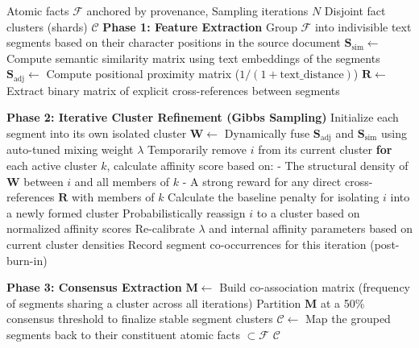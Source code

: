 \begin{algorithm}[t]
\caption{Segment-Grounded Fact Clustering}
\label{alg:cluster}
\begin{algorithmic}[1]
  \Require Atomic facts $\mathcal{F}$ anchored by provenance, Sampling iterations $N$
  \Ensure Disjoint fact clusters (shards) $\mathcal{C}$
  \State \textbf{Phase 1: Feature Extraction}
  \State Group $\mathcal{F}$ into indivisible text segments based on their character positions in the source document
  \State $\mathbf{S}_{\text{sim}} \gets$ Compute semantic similarity matrix using text embeddings of the segments
  \State $\mathbf{S}_{\text{adj}} \gets$ Compute positional proximity matrix ($1 / (1 + \text{text\_distance})$)
  \State $\mathbf{R} \gets$ Extract binary matrix of explicit cross-references between segments
  
  \State \textbf{Phase 2: Iterative Cluster Refinement (Gibbs Sampling)}
  \State Initialize each segment into its own isolated cluster
    \State $\mathbf{W} \gets$ Dynamically fuse $\mathbf{S}_{\text{adj}}$ and $\mathbf{S}_{\text{sim}}$ using auto-tuned mixing weight $\lambda$
      \State Temporarily remove $i$ from its current cluster
      \State \textbf{for} each active cluster $k$, calculate affinity score based on:
      \State \quad - The structural density of $\mathbf{W}$ between $i$ and all members of $k$
      \State \quad - A strong reward for any direct cross-references $\mathbf{R}$ with members of $k$
      \State Calculate the baseline penalty for isolating $i$ into a newly formed cluster
      \State Probabilistically reassign $i$ to a cluster based on normalized affinity scores
    \EndFor
      \State Re-calibrate $\lambda$ and internal affinity parameters based on current cluster densities
    \EndIf
    \State Record segment co-occurrences for this iteration (post-burn-in)
  \EndFor
  
  \State \textbf{Phase 3: Consensus Extraction}
  \State $\mathbf{M} \gets$ Build co-association matrix (frequency of segments sharing a cluster across all iterations)
  \State Partition $\mathbf{M}$ at a 50\% consensus threshold to finalize stable segment clusters
  \State $\mathcal{C} \gets$ Map the grouped segments back to their constituent atomic facts $\subset \mathcal{F}$
  \State \Return $\mathcal{C}$
\end{algorithmic}
\end{algorithm}
